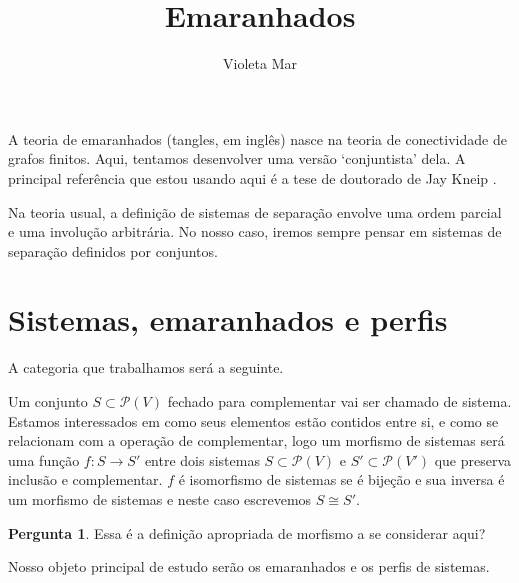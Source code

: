 \documentclass[11pt]{article}
\title{Emaranhados}
\author{Violeta Mar}
\date{}
\renewcommand{\textit}[1]{{\fakeitalic#1}}
\theoremstyle{definition}
\theoremstyle{definition}
\theoremstyle{definition}
\theoremstyle{definition}
\theoremstyle{definition}
\theoremstyle{definition}
\theoremstyle{definition}
\theoremstyle{definition}
\newtheorem*{definition*}{Definição}
\newenvironment{definicao*}{
\definecolor{shadecolor}{HTML}{defcfc}
\begin{shaded}
\begin{definition*}
}
{
\end{definition*}
\end{shaded}
}
\theoremstyle{definition}
\theoremstyle{definition}
\theoremstyle{definition}
\theoremstyle{definition}
\theoremstyle{definition}
\theoremstyle{definition}
\newtheorem{preguta}{Pergunta}
\newenvironment{pergunta}{
\definecolor{shadecolor}{HTML}{FFF8F0}
\begin{shaded}
\begin{preguta}
}
{
\end{preguta}
\end{shaded}
}
\begin{document}
\maketitle

A teoria de emaranhados (\textit{tangles}, em inglês) nasce na teoria de conectividade de grafos finitos. Aqui, tentamos desenvolver uma versão `conjuntista' dela. A principal referência que estou usando aqui é a tese de doutorado de Jay Kneip \cite{wheretofindthem}.

Na teoria usual, a definição de sistemas de separação envolve uma ordem parcial e uma involução arbitrária. No nosso caso, iremos sempre pensar em sistemas de separação definidos por conjuntos.


\section{Sistemas, emaranhados e perfis}

A categoria que trabalhamos será a seguinte.

\begin{definicao*}
  Um conjunto $S \subset \mathcal{P}(V)$ fechado para complementar vai ser chamado de sistema. Estamos interessados em como seus elementos estão contidos entre si, e como se relacionam com a operação de complementar, logo um morfismo de sistemas será uma função $f: S \rightarrow S'$ entre dois sistemas $S \subset \mathcal{P}(V)$ e $S' \subset \mathcal{P}(V')$ que preserva inclusão e complementar. $f$ é isomorfismo de sistemas se é bijeção e sua inversa é um morfismo de sistemas e neste caso escrevemos $S \cong S'$.
\end{definicao*}

\begin{pergunta}
Essa é a definição apropriada de morfismo a se considerar aqui?
\end{pergunta}

Nosso objeto principal de estudo serão os emaranhados e os perfis de sistemas.
\end{document}
